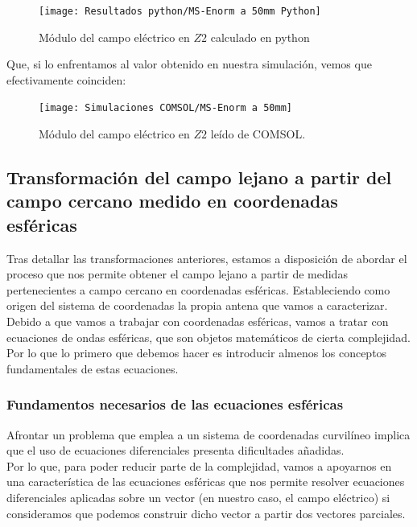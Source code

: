 \documentclass{article}
\begin{document}
\begin{figure}[h]
  \centering
    \texttt{[image: Resultados python/MS-Enorm a 50mm Python]}
    \caption{Módulo del campo eléctrico en $Z2$ calculado en python}
    \label{MS-FFT 2D Ez}
\end{figure}

\newpage
Que, si lo enfrentamos al valor obtenido en nuestra simulación, vemos que efectivamente coinciden:

\begin{figure}[h]
  \centering
    \texttt{[image: Simulaciones COMSOL/MS-Enorm a 50mm]}
    \caption{Módulo del campo eléctrico en $Z2$ leído de COMSOL.}
    \label{MS-Enorm a 50mm}
\end{figure}

\newpage

\subsection{Transformación del campo lejano a partir del campo cercano medido
en coordenadas esféricas}

Tras detallar las transformaciones anteriores, estamos a disposición de abordar el proceso que nos permite obtener el campo lejano a partir de medidas pertenecientes a campo cercano en coordenadas esféricas. Estableciendo como origen del sistema de coordenadas la propia antena que vamos a caracterizar.\\

Debido a que vamos a trabajar con coordenadas esféricas, vamos a tratar con ecuaciones de ondas esféricas, que son objetos matemáticos de cierta complejidad. Por lo que lo primero que debemos hacer es introducir almenos los conceptos fundamentales de estas ecuaciones.

\subsubsection{Fundamentos necesarios de las ecuaciones esféricas}

Afrontar un problema que emplea a un sistema de coordenadas curvilíneo implica que el uso de ecuaciones diferenciales presenta dificultades añadidas. \\
Por lo que, para poder reducir parte de la complejidad, vamos a apoyarnos en una característica de las ecuaciones esféricas que nos permite resolver ecuaciones diferenciales aplicadas sobre un vector (en nuestro caso, el campo eléctrico) si consideramos que podemos construir dicho vector a partir dos vectores parciales.\\
\end{document}
